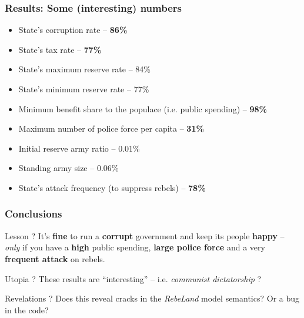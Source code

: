 \documentclass{beamer}
\begin{document}
\begin{frame}
	\frametitle{Results: Some (interesting) numbers}
	\begin{itemize}
		\item State's corruption rate -- \textbf{86\%} 
		\item State's tax rate -- \textbf{77\%}
		\item State's maximum reserve rate -- 84\%
		\item State's minimum reserve rate -- 77\%
		\item Minimum benefit share to the populace (i.e. public spending) -- \textbf{98\%}
		\item Maximum number of police force per capita -- \textbf{31\%}
		\item Initial reserve army ratio -- 0.01\%
		\item Standing army size -- 0.06\%
		\item State's attack frequency (to suppress rebels) -- \textbf{78\%}
	\end{itemize}
\end{frame}
\begin{frame}
	\frametitle{Conclusions}
	\begin{block}{Lesson ?}
		It's \textbf{fine} to run a \textbf{corrupt} government and keep its people \textbf{happy} -- \emph{only} if you have a \textbf{high} public spending, \textbf{large police force} and a very \textbf{frequent attack} on rebels.
	\end{block}
	\begin{block}{Utopia ?}
		These results are ``interesting'' -- i.e. \textit{communist dictatorship} ?
	\end{block}
	\begin{block}{Revelations ?}
		Does this reveal cracks in the \emph{RebeLand} model semantics? Or a bug in the code?
	\end{block}
\end{frame}
\end{document}
